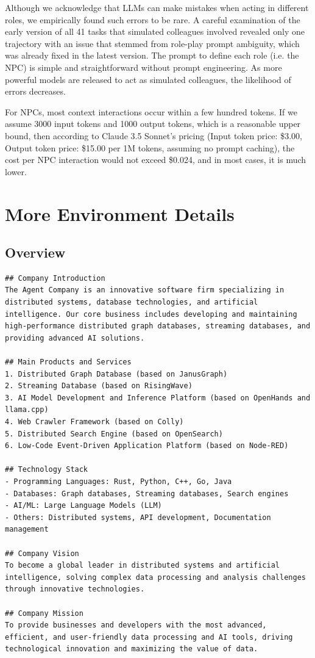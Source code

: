 Although we acknowledge that LLMs can make mistakes when acting in different roles, we empirically found such errors to be rare. A careful examination of the early version of all 41 tasks that simulated colleagues involved revealed only one trajectory with an issue that stemmed from role-play prompt ambiguity, which was already fixed in the latest \tac version. The prompt to define each role (i.e. the NPC) is simple and straightforward without prompt engineering. As more powerful models are released to act as simulated colleagues, the likelihood of errors decreases.

For NPCs, most context interactions occur within a few hundred tokens. If we assume 3000 input tokens and 1000 output tokens, which is a reasonable upper bound, then according to Claude 3.5 Sonnet's pricing (Input token price: \$3.00, Output token price: \$15.00 per 1M tokens, assuming no prompt caching), the cost per NPC interaction would not exceed \$0.024, and in most cases, it is much lower.


\section{More \tac Environment Details}
\label{app:envdetail}
\subsection{\tac Overview}
\begin{lstlisting}
## Company Introduction
The Agent Company is an innovative software firm specializing in distributed systems, database technologies, and artificial intelligence. Our core business includes developing and maintaining high-performance distributed graph databases, streaming databases, and providing advanced AI solutions.

## Main Products and Services
1. Distributed Graph Database (based on JanusGraph)
2. Streaming Database (based on RisingWave)
3. AI Model Development and Inference Platform (based on OpenHands and llama.cpp)
4. Web Crawler Framework (based on Colly)
5. Distributed Search Engine (based on OpenSearch)
6. Low-Code Event-Driven Application Platform (based on Node-RED)

## Technology Stack
- Programming Languages: Rust, Python, C++, Go, Java
- Databases: Graph databases, Streaming databases, Search engines
- AI/ML: Large Language Models (LLM)
- Others: Distributed systems, API development, Documentation management

## Company Vision
To become a global leader in distributed systems and artificial intelligence, solving complex data processing and analysis challenges through innovative technologies.

## Company Mission
To provide businesses and developers with the most advanced, efficient, and user-friendly data processing and AI tools, driving technological innovation and maximizing the value of data.
\end{lstlisting}


